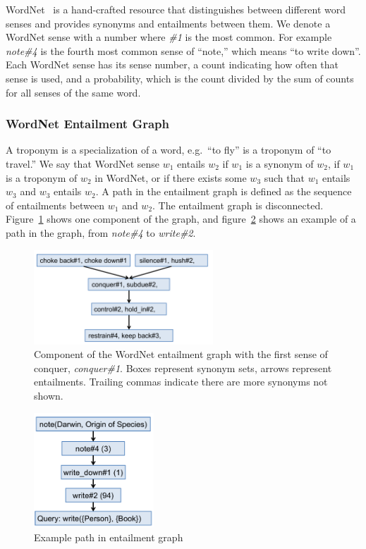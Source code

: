 \documentclass{article}
\begin{document}
WordNet~\cite{fellbaum98wordnet} is a hand-crafted resource that distinguishes between different word senses and provides synonyms and entailments between them. We denote a WordNet sense with a number where \textit{\#1} is the most common. For example \textit{note\#4} is the fourth most common sense of ``note,'' which means ``to write down''. Each WordNet sense has its sense number, a count indicating how often that sense is used, and a probability, which is the count divided by the sum of counts for all senses of the same word.

\subsubsection{WordNet Entailment Graph}
A troponym is a specialization of a word, e.g.\ ``to fly'' is a troponym of ``to travel.'' We say that WordNet sense $w_1$ entails $w_2$ if $w_1$ is a synonym of $w_2$, if $w_1$ is a troponym of $w_2$ in WordNet, or if there exists some $w_3$ such that $w_1$ entails $w_3$ and $w_3$ entails $w_2$. A path in the entailment graph is defined as the sequence of entailments between $w_1$ and $w_2$. The entailment graph is disconnected. Figure~\ref{wordnet-graph} shows one component of the graph, and figure~\ref{example-path} shows an example of a path in the graph, from \textit{note\#4} to \textit{write\#2}.

\begin{figure}[h]
\begin{center}
\includegraphics[width=0.6\textwidth]{figures/wordnet-graph.pdf}
\end{center}
\caption{Component of the WordNet entailment graph with the first sense of conquer, \textit{conquer\#1}. Boxes represent synonym sets, arrows represent entailments. Trailing commas indicate there are more synonyms not shown.}\label{wordnet-graph}
\end{figure}

\begin{figure}[h]
\begin{center}
\includegraphics[width=0.4\textwidth]{figures/example-path.pdf}
\end{center}
\caption{Example path in entailment graph}\label{example-path}
\end{figure}
\end{document}
